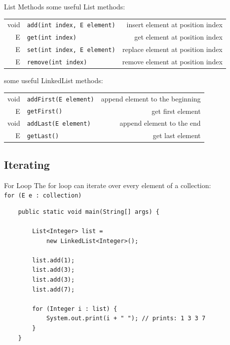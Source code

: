 \begin{frame}[fragile]{List Methods}
	some useful List methods:\\
	\vspace{1em}
	\begin{tabular}{ r l r }
		void & \texttt{add(int index, E element)}
		& \footnotesize{insert element at position index} \\
		E &\texttt{get(int index)}
		& \footnotesize{get element at position index} \\
		E &\texttt{set(int index, E element)}
		& \footnotesize{replace element at position index} \\
		E &\texttt{remove(int index)}
		& \footnotesize{remove element at position index}
	\end{tabular}
	\vfill
	some useful LinkedList methods:\\
	\vspace{1em}
	\begin{tabular}{ r l r }
		void & \texttt{addFirst(E element)}
		& \footnotesize{append element to the beginning} \\
		E & \texttt{getFirst()}
		& \footnotesize{get first element} \\
		void & \texttt{addLast(E element)}
		& \footnotesize{append element to the end} \\
		E & \texttt{getLast()}
		& \footnotesize{get last element}
	\end{tabular}
\end{frame}

\subsection{Iterating}
\begin{frame}[fragile]{For Loop}
	The for loop can iterate over every element of a collection:\\
	\hspace{1em}\texttt{for (E e : collection)}
	\begin{lstlisting}
	public static void main(String[] args) {
	
	    List<Integer> list = 
	        new LinkedList<Integer>();
	    
	    list.add(1);
	    list.add(3);
	    list.add(3);
	    list.add(7);
	    
	    for (Integer i : list) {
	        System.out.print(i + " "); // prints: 1 3 3 7
	    }
	}
	\end{lstlisting}
\end{frame}

